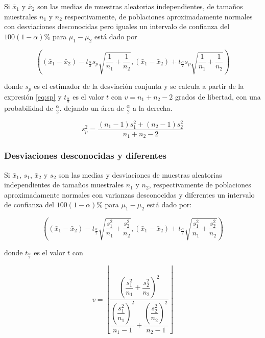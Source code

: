 \documentclass[letterpaper,]{book}
\begin{document}
Si \(\bar{x}_1\) y \(\bar{x}_2\) son las medias de muestras aleatorias independientes, de tamaños muestrales \(n_1\) y \(n_2\) respectivamente, de poblaciones aproximadamente normales con desviaciones desconocidas pero iguales un intervalo de confianza del \(100\left(1-\alpha \right)\%\) para \(\mu_1 - \mu_2\) está dado por

\begin{equation} 
\left( \left( \bar{x}_1 - \bar{x}_2 \right) - t_{\frac{\alpha}{2}}s_p\sqrt{\dfrac{1}{n_1} + \dfrac{1}{n_2}} , \left( \bar{x}_1 - \bar{x}_2 \right) + t_{\frac{\alpha}{2}}s_p\sqrt{\dfrac{1}{n_1} + \dfrac{1}{n_2}} \right) 
\label{eq:ic2msd}
\end{equation}

donde \(s_p\) es el estimador de la desviación conjunta y se calcula a partir de la expresión \eqref{eq:sp} y \(t_{\frac{\alpha}{2}}\) es el valor \(t\) con \(v=n_1+n_2-2\) grados de libertad, con una probabilidad de \(\frac{\alpha}{2}\). dejando un área de \(\frac{\alpha}{2}\) a la derecha.

\begin{equation} 
s_p^2 = \dfrac{\left(n_1 - 1 \right)s_1^2+\left(n_2 - 1 \right)s_2^2}{n_1 +n_2 -2} 
\label{eq:sp}
\end{equation}

\hypertarget{desviaciones-desconocidas-y-diferentes}{%
\subsubsection{Desviaciones desconocidas y diferentes}\label{desviaciones-desconocidas-y-diferentes}}

Si \(\bar{x}_1\), \(s_1\), \(\bar{x}_2\) y \(s_2\) son las medias y desviaciones de muestras aleatorias independientes de tamaños muestrales \(n_1\) y \(n_2\), respectivamente de poblaciones aproximadamente normales con varianzas desconocidas y diferentes un intervalo de confianza del \(100\left(1-\alpha \right)\%\) para \(\mu_1 - \mu_2\) está dado por:

\begin{equation} 
\left( \left( \bar{x}_1 - \bar{x}_2 \right) - t_{\frac{\alpha}{2}}\sqrt{\dfrac{s_1^2}{n_1} + \dfrac{s_2^2}{n_2}} , \left( \bar{x}_1 - \bar{x}_2 \right) + t_{\frac{\alpha}{2}}\sqrt{\dfrac{s_1^2}{n_1} + \dfrac{s_2^2}{n_2}} \right) 
\label{eq:ic2msdd}
\end{equation}

donde \(t_{\frac{\alpha}{2}}\) es el valor \(t\) con

\begin{equation} 
v = \left\lfloor\dfrac{\left(\dfrac{s_1^2}{n_1} + \dfrac{s_2^2}{n_2} \right)^2}{\dfrac{\left( \dfrac{s_1^2}{n_1} \right)^2}{n_1-1}+\dfrac{\left( \dfrac{s_2^2}{n_2} \right)^2}{n_2-1}}\right\rfloor
\label{eq:dfsdd}
\end{equation}
\end{document}
